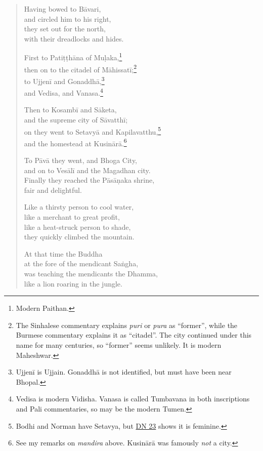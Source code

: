 \documentclass[12pt,openany]{book}%
\begin{document}
\begin{verse}
Having bowed to \textsanskrit{Bāvari}, \\
and circled him to his right, \\
they set out for the north, \\
with their dreadlocks and hides. 

First to \textsanskrit{Patiṭṭhāna} of \textsanskrit{Muḷaka},\footnote{Modern Paithan. } \\
then on to the citadel of \textsanskrit{Māhissatī};\footnote{The Sinhalese commentary explains \textit{puri} or \textit{pura} as “former”, while the Burmese commentary explains it as “citadel”. The city continued under this name for many centuries, so “former” seems unlikely. It is modern Maheshwar. } \\
to \textsanskrit{Ujjenī} and \textsanskrit{Gonaddhā},\footnote{\textsanskrit{Ujjenī} is Ujjain. \textsanskrit{Gonaddhā} is not identified, but must have been near Bhopal. } \\
and Vedisa, and Vanasa.\footnote{Vedisa is modern Vidisha. Vanasa is called Tumbavana in both inscriptions and Pali commentaries, so may be the modern Tumen. } 

Then to \textsanskrit{Kosambī} and \textsanskrit{Sāketa}, \\
and the supreme city of \textsanskrit{Sāvatthī}; \\
on they went to \textsanskrit{Setavyā} and Kapilavatthu,\footnote{Bodhi and Norman have Setavya, but \href{https://suttacentral.net/dn23/en/sujato}{DN 23} shows it is feminine. } \\
and the homestead at \textsanskrit{Kusinārā}.\footnote{See my remarks on \textit{mandira} above. \textsanskrit{Kusinārā} was famously \emph{not} a city. } 

To \textsanskrit{Pāvā} they went, and Bhoga City, \\
and on to \textsanskrit{Vesālī} and the Magadhan city. \\
Finally they reached the \textsanskrit{Pāsāṇaka} shrine, \\
fair and delightful. 

Like a thirsty person to cool water, \\
like a merchant to great profit, \\
like a heat-struck person to shade, \\
they quickly climbed the mountain. 

At that time the Buddha \\
at the fore of the mendicant \textsanskrit{Saṅgha}, \\
was teaching the mendicants the Dhamma, \\
like a lion roaring in the jungle. 


\end{verse}
\end{document}
